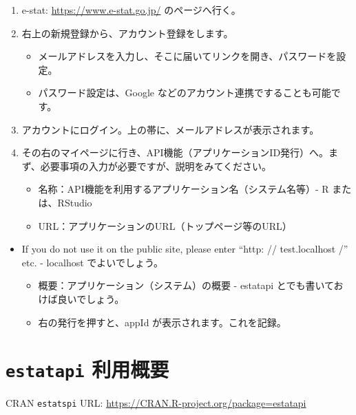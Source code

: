 \documentclass[
  xelatex, ja=standard]{bxjsbook}
\providecommand{\tightlist}{%
  \setlength{\itemsep}{0pt}\setlength{\parskip}{0pt}}
\theoremstyle{definition}
\theoremstyle{definition}
\theoremstyle{definition}
\theoremstyle{definition}
\theoremstyle{remark}
\begin{document}
\begin{enumerate}
\def\labelenumi{\arabic{enumi}.}
\tightlist
\item
  e-stat: \url{https://www.e-stat.go.jp/} のページへ行く。
\item
  右上の新規登録から、アカウント登録をします。

  \begin{itemize}
  \tightlist
  \item
    メールアドレスを入力し、そこに届いてリンクを開き、パスワードを設定。
  \item
    パスワード設定は、Google などのアカウント連携ですることも可能です。
  \end{itemize}
\item
  アカウントにログイン。上の帯に、メールアドレスが表示されます。
\item
  その右のマイページに行き、API機能（アプリケーションID発行）へ。まず、必要事項の入力が必要ですが、説明をみてください。

  \begin{itemize}
  \tightlist
  \item
    名称：API機能を利用するアプリケーション名（システム名等）- R または、RStudio
  \item
    URL：アプリケーションのURL（トップページ等のURL）
  \end{itemize}
\end{enumerate}

\begin{itemize}
\tightlist
\item
  If you do not use it on the public site, please enter ``http: // test.localhost /'' etc. - localhost でよいでしょう。

  \begin{itemize}
  \tightlist
  \item
    概要：アプリケーション（システム）の概要 - estatapi とでも書いておけば良いでしょう。
  \item
    右の発行を押すと、appId が表示されます。これを記録。
  \end{itemize}
\end{itemize}

\hypertarget{estatapi-ux5229ux7528ux6982ux8981-1}{%
\section{\texorpdfstring{\texttt{estatapi} 利用概要}{estatapi 利用概要}}\label{estatapi-ux5229ux7528ux6982ux8981-1}}

CRAN \texttt{estatspi} URL: \url{https://CRAN.R-project.org/package=estatapi}
\end{document}
